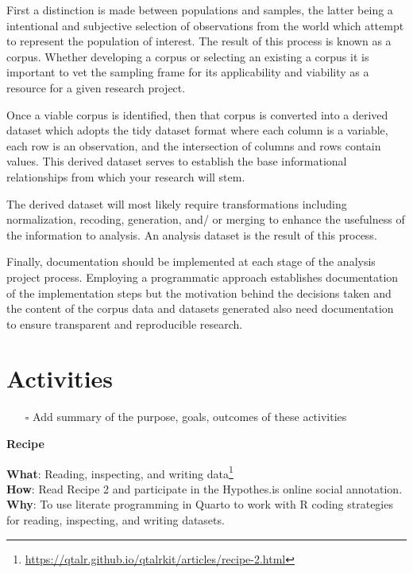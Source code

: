 \documentclass[
  letterpaper,
]{latex/krantz}
\providecommand{\tightlist}{%
  \setlength{\itemsep}{0pt}\setlength{\parskip}{0pt}}\usepackage{longtable,booktabs,array}
\DeclareRobustCommand{\href}[2]{#2\footnote{\url{#1}}}
\begin{document}
First a distinction is made between populations and samples, the latter
being a intentional and subjective selection of observations from the
world which attempt to represent the population of interest. The result
of this process is known as a corpus. Whether developing a corpus or
selecting an existing a corpus it is important to vet the sampling frame
for its applicability and viability as a resource for a given research
project.

Once a viable corpus is identified, then that corpus is converted into a
derived dataset which adopts the tidy dataset format where each column
is a variable, each row is an observation, and the intersection of
columns and rows contain values. This derived dataset serves to
establish the base informational relationships from which your research
will stem.

The derived dataset will most likely require transformations including
normalization, recoding, generation, and/ or merging to enhance the
usefulness of the information to analysis. An analysis dataset is the
result of this process.

Finally, documentation should be implemented at each stage of the
analysis project process. Employing a programmatic approach establishes
documentation of the implementation steps but the motivation behind the
decisions taken and the content of the corpus data and datasets
generated also need documentation to ensure transparent and reproducible
research.

\hypertarget{activities-1}{%
\section*{Activities}\label{activities-1}}


\begin{itemize}
\tightlist
\item[$\square$]
  Add summary of the purpose, goals, outcomes of these activities
\end{itemize}

\begin{tcolorbox}[enhanced jigsaw, left=2mm, arc=.35mm, colback=white, rightrule=.15mm, toprule=.15mm, breakable, leftrule=.75mm, opacityback=0, bottomrule=.15mm]

\textbf{ Recipe}

\textbf{What}:
\href{https://qtalr.github.io/qtalrkit/articles/recipe-2.html}{Reading,
inspecting, and writing data}\\
\textbf{How}: Read Recipe 2 and participate in the Hypothes.is online
social annotation.\\
\textbf{Why}: To use literate programming in Quarto to work with R
coding strategies for reading, inspecting, and writing datasets.

\end{tcolorbox}
\end{document}
